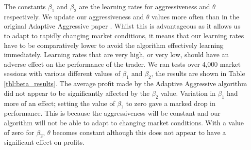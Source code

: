 \documentclass[preprint]{acm_proc_article-sp} %
\begin{document}
The constants $\beta_1$ and $\beta_2$ are the learning rates for aggressiveness
and $\theta$ respectively.  We update our aggressiveness and $\theta$ values
more often than in the original Adaptive Aggressive paper \cite{AA_thesis}.
Whilst this is advantageous as it allows us to adapt to rapidly changing market
conditions, it means that our learning rates have to be comparatively lower to
avoid the algorithm effectively learning immediately. Learning rates that are very high, or very low, should have an
adverse effect on the performance of the trader. We ran tests over
4,000 market sessions with various different values of $\beta_1$ and
$\beta_2$, the results are shown in Table \ref{tbl:beta_results}.  The average
profit made by the Adaptive Aggressive algorithm did not appear to be significantly affected by the $\beta_2$ value. Variation in $\beta_1$ had more of an effect; setting the value of $\beta_1$ to zero gave a marked drop in performance.
This is because the aggressiveness will be constant and our algorithm will not
be able to adapt to changing market conditions. With a value of zero for $\beta_2$,
$\theta$ becomes constant although this does not appear to have a significant effect on profits. 
\end{document}
